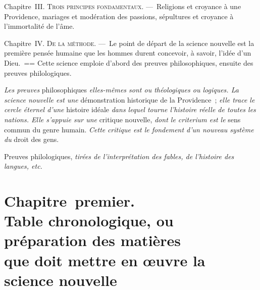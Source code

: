 \documentclass[french,twoside]{book} %
\newcommand\chapteropen{} %
\newcommand\chapterclose{} %
\begin{document}
Chapitre {\scshape III. Trois principes fondamentaux.} — Religions et croyance à une Providence, mariages et modération des passions, sépultures et croyance à l’immortalité de l’âme.\par
Chapitre {\scshape IV. De la méthode.} — Le point de départ de la science nouvelle est la première pensée humaine que les hommes durent concevoir, à savoir, l’idée d’un Dieu. == Cette science emploie d’abord des preuves philosophiques, ensuite des preuves philologiques.\par
{\itshape Les preuves} philosophiques {\itshape elles-mêmes sont ou théologiques ou logiques. La science nouvelle est une} démonstration historique de la Providence ; {\itshape elle trace le cercle éternel d’une} histoire idéale {\itshape dans lequel tourne l’histoire réelle de toutes les nations. Elle s’appuie sur une} critique nouvelle, {\itshape dont le criterium est le} sens commun du genre humain. {\itshape Cette}  {\itshape critique est le fondement d’un nouveau système du} droit des gens.\par
Preuves philologiques, {\itshape tirées de l’interprétation des fables, de l’histoire des langues, etc.}
\chapterclose


\chapteropen
\chapter[{Chapitre premier. Table chronologique, ou préparation des matières. que doit mettre en œuvre la science nouvelle}]{Chapitre premier. \\
Table chronologique, ou préparation des matières \\
que doit mettre en œuvre la science nouvelle}
\end{document}
